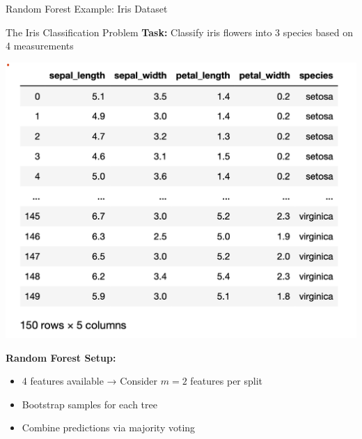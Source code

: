 \documentclass[8pt]{beamer}
\newcommand{\fitpic}[1]{\begin{adjustbox}{max width=\linewidth, max totalheight=0.78\textheight}#1\end{adjustbox}}
\begin{document}
\begin{frame}{Random Forest Example: Iris Dataset}
\begin{examplebox}{The Iris Classification Problem}
\textbf{Task:} Classify iris flowers into 3 species based on 4 measurements
\end{examplebox}

  \vspace{0.3cm}
  \centering
  \fitpic{\includegraphics[scale=0.5]{../assets/ensemble/diagrams/dataset-iris.png}}

\begin{keypointsbox}
\textbf{Random Forest Setup:}
\begin{itemize}
\item 4 features available → Consider $m = 2$ features per split
\item Bootstrap samples for each tree
\item Combine predictions via majority voting
\end{itemize}
\end{keypointsbox}
\end{frame}
\end{document}
